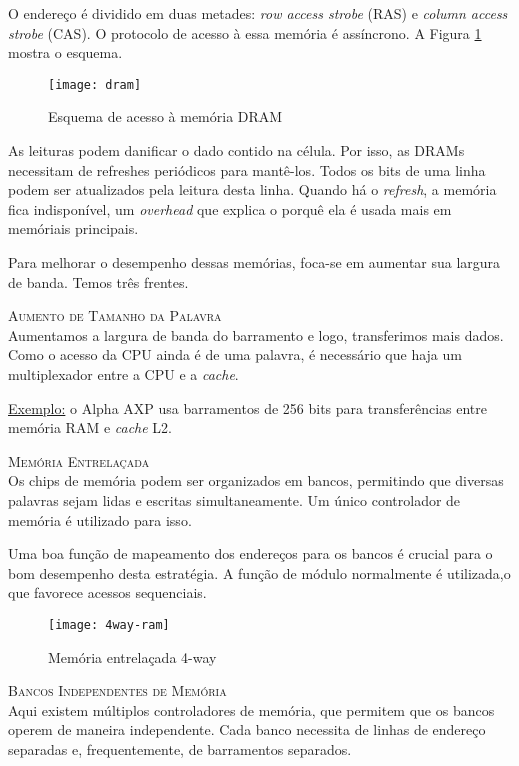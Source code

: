 O endereço é dividido em duas metades: \textit{row access strobe} (RAS) e \textit{column access strobe} (CAS). O protocolo de acesso à essa memória é assíncrono. A Figura \ref{fig:dram} mostra o esquema.

\begin{figure}[ht]
  \centering
  \texttt{[image: dram]}
  \caption{Esquema de acesso à memória DRAM}
  \label{fig:dram}
\end{figure}

As leituras podem danificar o dado contido na célula. Por isso, as DRAMs necessitam de refreshes periódicos para mantê-los. Todos os bits de uma linha podem ser atualizados pela leitura desta linha. Quando há o \textit{refresh}, a memória fica indisponível, um \textit{overhead} que explica o porquê ela é usada mais em memóriais principais.

Para melhorar o desempenho dessas memórias, foca-se em aumentar sua largura de banda. Temos três frentes.

\textsc{Aumento de Tamanho da Palavra}\\
Aumentamos a largura de banda do barramento e logo, transferimos mais dados. Como o acesso da CPU ainda é de uma palavra, é necessário que haja um multiplexador entre a CPU e a \textit{cache}.

\underline{Exemplo:} o Alpha AXP usa barramentos de 256 bits para transferências entre memória RAM e \textit{cache} L2.


\textsc{Memória Entrelaçada}\\
Os chips de memória podem ser organizados em bancos, permitindo que diversas palavras sejam lidas e escritas simultaneamente. Um único controlador de memória é utilizado para isso.

Uma boa função de mapeamento dos endereços para os bancos é crucial para o bom desempenho desta estratégia. A função de módulo normalmente é utilizada,o que favorece acessos sequenciais.

\begin{figure}[ht]
  \centering
  \texttt{[image: 4way-ram]}
  \caption{Memória entrelaçada 4-way}
  \label{fig:fourway-ram}
\end{figure}

\textsc{Bancos Independentes de Memória}\\
Aqui existem múltiplos controladores de memória, que permitem que os bancos operem de maneira independente. Cada banco necessita de linhas de endereço separadas e, frequentemente, de barramentos separados.

